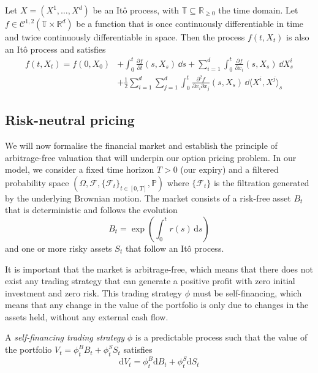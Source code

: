\begin{theorem}
    Let $X = (X^1, \dots, X^d)$ be an Itô process, with $\mathbb T \subseteq \mathbb R_{\ge 0}$ the time domain. Let $f \in \mathcal C^{1, 2}(\mathbb T \times \mathbb R^d)$ be a function that is once continuously differentiable in time and twice continuously differentiable in space. Then the process $f(t, X_t)$ is also an Itô process and satisfies
    \begin{equation}
        \begin{aligned}
            f(t, X_t) = f(0, X_0) &+ \int_0^t \frac{\partial f}{\partial t} (s, X_s)\,\dd s + \sum_{i=1}^d \int_0^t \frac{\partial f}{\partial x_i}(s, X_s) \,\dd X_s^i \\
            &+ \frac 12 \sum_{i=1}^d\sum_{j=1}^d \int_0^t \frac{\partial^2 f}{\partial x_i\partial x_j}(s, X_s) \,\dd \langle X^i, X^j\rangle_s
        \end{aligned}
    \end{equation}
\label{thm:ito_lemma}
\end{theorem}

\subsection{Risk-neutral pricing}
\label{sec:risk-neutral-pricing}

We will now formalise the financial market and establish the principle of arbitrage-free valuation that will underpin our option pricing problem. In our model, we consider a fixed time horizon $T > 0$ (our expiry) and a filtered probability space $(\Omega, \mathcal F, \{\mathcal F_t\}_{t \in [0, T]}, \mathbb P)$ where $\{\mathcal F_t\}$ is the filtration generated by the underlying Brownian motion. The market consists of a risk-free asset $B_t$ that is deterministic and follows the evolution
\begin{equation}
    B_t = \exp\left(\int_0^t r(s) \,\mathrm ds\right)
\end{equation}
and one or more risky assets $S_t$ that follow an Itô process.

It is important that the market is arbitrage-free, which means that there does not exist any trading strategy that can generate a positive profit with zero initial investment and zero risk. This trading strategy $\phi$ must be self-financing, which means that any change in the value of the portfolio is only due to changes in the assets held, without any external cash flow.

\begin{definition}
    A \textit{self-financing trading strategy} $\phi$ is a predictable process such that the value of the portfolio $V_t = \phi_t^B B_t + \phi_t^S S_t$ satisfies
    \begin{equation}
        \mathrm d V_t = \phi_t^B \mathrm d B_t + \phi_t^S \mathrm d S_t
    \end{equation}
\end{definition}

